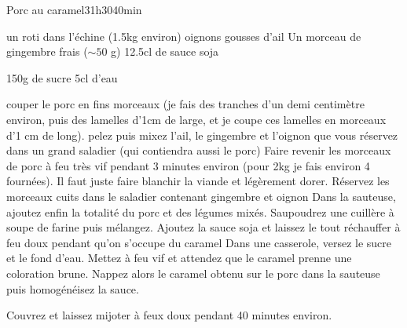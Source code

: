 \begin{recette}{Porc au caramel}{3}{1h30}{40min}

\begin{ingredients}
\ingredient un roti dans l'échine (1.5kg environ)
 oignons
 gousses d'ail
\ingredient Un morceau de gingembre frais ($\sim 50$ g)
\ingredient 12.5cl de sauce soja

\ingredient 150g de sucre
\ingredient 5cl d'eau
\end{ingredients}

\begin{preparation}
\etape couper le porc en fins morceaux (je fais des tranches d'un demi centimètre environ, puis des lamelles d'1cm de large, et
je coupe ces lamelles en morceaux d'1 cm de long).
\etape pelez puis mixez l'ail, le gingembre et l'oignon que vous réservez dans un grand saladier (qui contiendra aussi le porc)
\etape Faire revenir les morceaux de porc à feu très vif pendant 3 minutes environ (pour 2kg je fais environ 4 fournées). Il
faut juste faire blanchir la viande et légèrement dorer. Réservez les morceaux cuits dans le saladier contenant gingembre et
oignon
\etape Dans la sauteuse, ajoutez enfin la totalité du porc et des légumes mixés. 
\etape Saupoudrez une cuillère à soupe de farine puis mélangez. 
\etape Ajoutez la sauce soja et laissez le tout réchauffer à feu doux pendant qu'on s'occupe du caramel
\etape Dans une casserole, versez le sucre et le fond d'eau. Mettez à feu vif et attendez que le caramel prenne une coloration
brune.
\etape Nappez alors le caramel obtenu sur le porc dans la sauteuse puis homogénéisez la sauce.
\end{preparation}

\begin{cuisson}
Couvrez et laissez mijoter à feux doux pendant 40 minutes environ.
\end{cuisson}
\end{recette}

